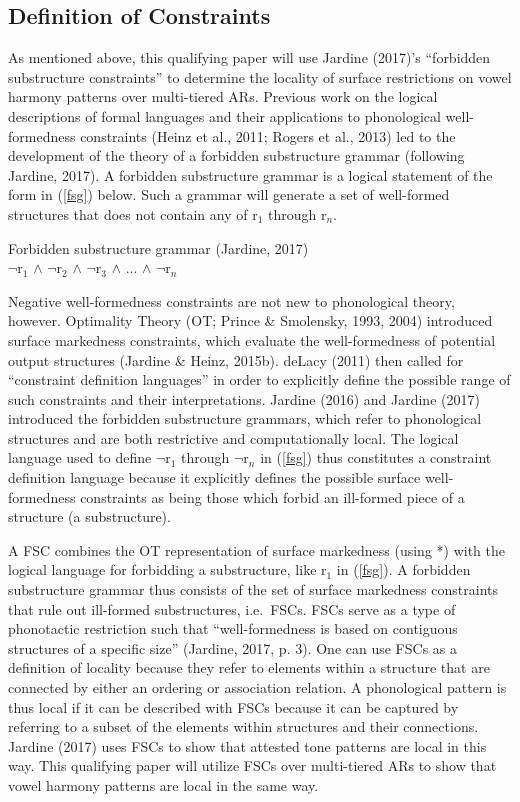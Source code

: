 \documentclass[,doc,floatsintext]{apa6}
\theoremstyle{definition}
\theoremstyle{definition}
\theoremstyle{definition}
\theoremstyle{remark}
\begin{document}
\subsection{Definition of Constraints}\label{definition-of-constraints}

As mentioned above, this qualifying paper will use Jardine (2017)'s
\enquote{forbidden substructure constraints} to determine the locality
of surface restrictions on vowel harmony patterns over multi-tiered ARs.
Previous work on the logical descriptions of formal languages and their
applications to phonological well-formedness constraints (Heinz et al.,
2011; Rogers et al., 2013) led to the development of the theory of a
forbidden substructure grammar (following Jardine, 2017). A forbidden
substructure grammar is a logical statement of the form in (\ref{fsg})
below. Such a grammar will generate a set of well-formed structures that
does not contain any of r\(_1\) through r\(_n\).

\begin{exe}
\ex Forbidden substructure grammar (Jardine, 2017) \label{fsg} \\
$\neg$r$_1$ $\wedge$ $\neg$r$_2$ $\wedge$ $\neg$r$_3$ $\wedge$ ... $\wedge$ $\neg$r$_n$
\end{exe}

Negative well-formedness constraints are not new to phonological theory,
however. Optimality Theory (OT; Prince \& Smolensky, 1993, 2004)
introduced surface markedness constraints, which evaluate the
well-formedness of potential output structures (Jardine \& Heinz,
2015b). deLacy (2011) then called for \enquote{constraint definition
languages} in order to explicitly define the possible range of such
constraints and their interpretations. Jardine (2016) and Jardine (2017)
introduced the forbidden substructure grammars, which refer to
phonological structures and are both restrictive and computationally
local. The logical language used to define \(\neg\)r\(_1\) through
\(\neg\)r\(_n\) in (\ref{fsg}) thus constitutes a constraint definition
language because it explicitly defines the possible surface
well-formedness constraints as being those which forbid an ill-formed
piece of a structure (a substructure).

A FSC combines the OT representation of surface markedness (using *)
with the logical language for forbidding a substructure, like r\(_1\) in
(\ref{fsg}). A forbidden substructure grammar thus consists of the set
of surface markedness constraints that rule out ill-formed
substructures, i.e.~FSCs. FSCs serve as a type of phonotactic
restriction such that \enquote{well-formedness is based on contiguous
structures of a specific size} (Jardine, 2017, p. 3). One can use FSCs
as a definition of locality because they refer to elements within a
structure that are connected by either an ordering or association
relation. A phonological pattern is thus local if it can be described
with FSCs because it can be captured by referring to a subset of the
elements within structures and their connections. Jardine (2017) uses
FSCs to show that attested tone patterns are local in this way. This
qualifying paper will utilize FSCs over multi-tiered ARs to show that
vowel harmony patterns are local in the same way.
\end{document}
